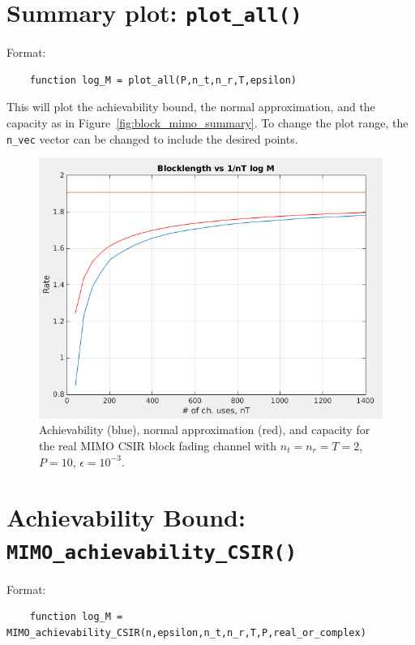 \documentclass[a4paper,11p]{memoir}
\begin{document}
\section{Summary plot: \texttt{plot\_all()}}

Format:
\begin{verbatim}
    function log_M = plot_all(P,n_t,n_r,T,epsilon)
\end{verbatim}

This will plot the achievability bound, the normal approximation, and the capacity as in Figure~\ref{fig:block_mimo_summary}.  To change the plot range, the \verb|n_vec| vector can be changed to include the desired points.

\begin{figure}[ht]\label{fig:block_mimo_summary}
    \centering
    \includegraphics[scale=0.50]{plots/block-csir-mimo.png}
\vspace{-1.5mm}
\caption{Achievability (blue), normal approximation (red), and capacity for the real MIMO CSIR block fading channel with $n_t = n_r = T = 2$, $P=10$, $\epsilon = 10^{-3}$.
\label{fig:bounds-simo}}
\end{figure}


\section{Achievability Bound: \texttt{MIMO\_achievability\_CSIR()}}

Format:
\begin{verbatim}
    function log_M = MIMO_achievability_CSIR(n,epsilon,n_t,n_r,T,P,real_or_complex)
\end{verbatim}
\end{document}
